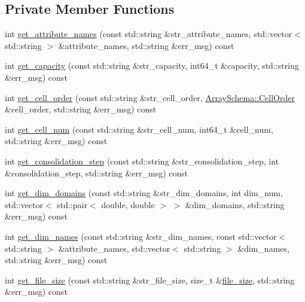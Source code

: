 \subsection*{Private Member Functions}
\begin{DoxyCompactItemize}
\item 
int \hyperlink{classCmdParser_a57b953fa13a01a77e713c6cb0b50f53f}{get\+\_\+attribute\+\_\+names} (const std\+::string \&str\+\_\+attribute\+\_\+names, std\+::vector$<$ std\+::string $>$ \&attribute\+\_\+names, std\+::string \&err\+\_\+msg) const 
\item 
int \hyperlink{classCmdParser_a06d4e25818a813dc88af1d41d808c2d6}{get\+\_\+capacity} (const std\+::string \&str\+\_\+capacity, int64\+\_\+t \&capacity, std\+::string \&err\+\_\+msg) const 
\item 
int \hyperlink{classCmdParser_a1c1d4095bd87cd2bbbbf135362b02e29}{get\+\_\+cell\+\_\+order} (const std\+::string \&str\+\_\+cell\+\_\+order, \hyperlink{classArraySchema_a847601130253f905337b5e284e1b78f2}{Array\+Schema\+::\+Cell\+Order} \&cell\+\_\+order, std\+::string \&err\+\_\+msg) const 
\item 
int \hyperlink{classCmdParser_ac19fbb24240f1dd0e056cb0a1a3d27ca}{get\+\_\+cell\+\_\+num} (const std\+::string \&str\+\_\+cell\+\_\+num, int64\+\_\+t \&cell\+\_\+num, std\+::string \&err\+\_\+msg) const 
\item 
int \hyperlink{classCmdParser_a6766b29a1a5b23baf3e71acdf08c14d4}{get\+\_\+consolidation\+\_\+step} (const std\+::string \&str\+\_\+consolidation\+\_\+step, int \&consolidation\+\_\+step, std\+::string \&err\+\_\+msg) const 
\item 
int \hyperlink{classCmdParser_abf09f29eb387029817b0128c74cc3998}{get\+\_\+dim\+\_\+domains} (const std\+::string \&str\+\_\+dim\+\_\+domains, int dim\+\_\+num, std\+::vector$<$ std\+::pair$<$ double, double $>$ $>$ \&dim\+\_\+domains, std\+::string \&err\+\_\+msg) const 
\item 
int \hyperlink{classCmdParser_a552d6795c14da13f2e08ad16bf017b4a}{get\+\_\+dim\+\_\+names} (const std\+::string \&str\+\_\+dim\+\_\+names, const std\+::vector$<$ std\+::string $>$ \&attribute\+\_\+names, std\+::vector$<$ std\+::string $>$ \&dim\+\_\+names, std\+::string \&err\+\_\+msg) const 
\item 
int \hyperlink{classCmdParser_a89c6bbde4d620c41c0f553f0c58676e9}{get\+\_\+file\+\_\+size} (const std\+::string \&str\+\_\+file\+\_\+size, size\+\_\+t \&\hyperlink{utils_8h_aa14a014680a5fa9b4c32f4764f58aaee}{file\+\_\+size}, std\+::string \&err\+\_\+msg) const 

\end{DoxyCompactItemize}
